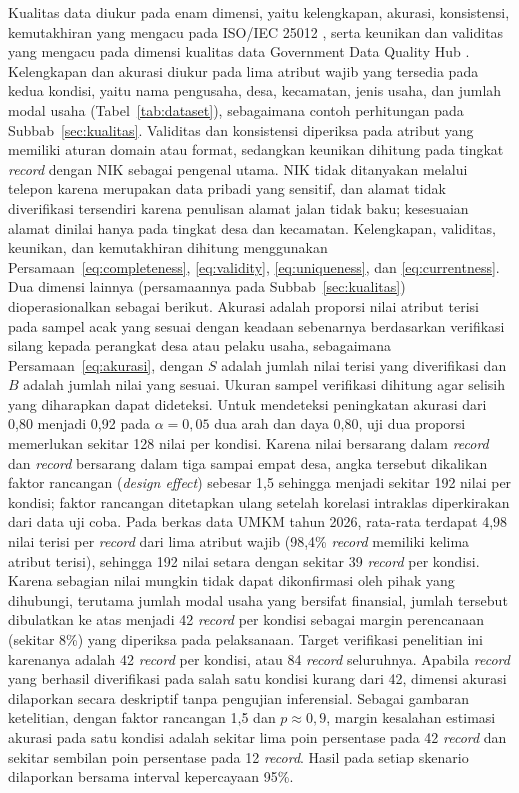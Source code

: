 Kualitas data diukur pada enam dimensi, yaitu kelengkapan, akurasi, konsistensi, kemutakhiran yang mengacu pada ISO/IEC 25012 \cite{iso25012}, serta keunikan dan validitas yang mengacu pada dimensi kualitas data Government Data Quality Hub \cite{govuk2021dqdimensions}. Kelengkapan dan akurasi diukur pada lima atribut wajib yang tersedia pada kedua kondisi, yaitu nama pengusaha, desa, kecamatan, jenis usaha, dan jumlah modal usaha (Tabel~\ref{tab:dataset}), sebagaimana contoh perhitungan pada Subbab~\ref{sec:kualitas}. Validitas dan konsistensi diperiksa pada atribut yang memiliki aturan domain atau format, sedangkan keunikan dihitung pada tingkat \textit{record} dengan NIK sebagai pengenal utama. NIK tidak ditanyakan melalui telepon karena merupakan data pribadi yang sensitif, dan alamat tidak diverifikasi tersendiri karena penulisan alamat jalan tidak baku; kesesuaian alamat dinilai hanya pada tingkat desa dan kecamatan. Kelengkapan, validitas, keunikan, dan kemutakhiran dihitung menggunakan Persamaan~\eqref{eq:completeness}, \eqref{eq:validity}, \eqref{eq:uniqueness}, dan \eqref{eq:currentness}. Dua dimensi lainnya (persamaannya pada Subbab~\ref{sec:kualitas}) dioperasionalkan sebagai berikut. Akurasi adalah proporsi nilai atribut terisi pada sampel acak yang sesuai dengan keadaan sebenarnya berdasarkan verifikasi silang kepada perangkat desa atau pelaku usaha, sebagaimana Persamaan~\eqref{eq:akurasi}, dengan $S$ adalah jumlah nilai terisi yang diverifikasi dan $B$ adalah jumlah nilai yang sesuai. Ukuran sampel verifikasi dihitung agar selisih yang diharapkan dapat dideteksi. Untuk mendeteksi peningkatan akurasi dari 0,80 menjadi 0,92 pada $\alpha = 0{,}05$ dua arah dan daya 0,80, uji dua proporsi memerlukan sekitar 128 nilai per kondisi. Karena nilai bersarang dalam \textit{record} dan \textit{record} bersarang dalam tiga sampai empat desa, angka tersebut dikalikan faktor rancangan (\textit{design effect}) sebesar 1,5 sehingga menjadi sekitar 192 nilai per kondisi; faktor rancangan ditetapkan ulang setelah korelasi intraklas diperkirakan dari data uji coba. Pada berkas data UMKM tahun 2026, rata-rata terdapat 4,98 nilai terisi per \textit{record} dari lima atribut wajib (98,4\% \textit{record} memiliki kelima atribut terisi), sehingga 192 nilai setara dengan sekitar 39 \textit{record} per kondisi. Karena sebagian nilai mungkin tidak dapat dikonfirmasi oleh pihak yang dihubungi, terutama jumlah modal usaha yang bersifat finansial, jumlah tersebut dibulatkan ke atas menjadi 42 \textit{record} per kondisi sebagai margin perencanaan (sekitar 8\%) yang diperiksa pada pelaksanaan. Target verifikasi penelitian ini karenanya adalah 42 \textit{record} per kondisi, atau 84 \textit{record} seluruhnya. Apabila \textit{record} yang berhasil diverifikasi pada salah satu kondisi kurang dari 42, dimensi akurasi dilaporkan secara deskriptif tanpa pengujian inferensial. Sebagai gambaran ketelitian, dengan faktor rancangan 1,5 dan $p \approx 0{,}9$, margin kesalahan estimasi akurasi pada satu kondisi adalah sekitar lima poin persentase pada 42 \textit{record} dan sekitar sembilan poin persentase pada 12 \textit{record}. Hasil pada setiap skenario dilaporkan bersama interval kepercayaan 95\%.

